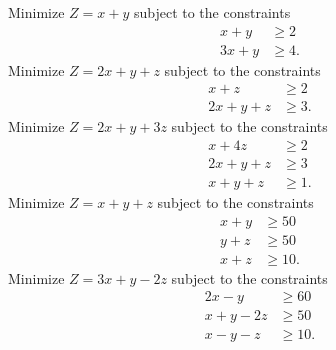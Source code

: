 
\begin{Exercise}[
name={},
title={}, 
difficulty=0,
origin={\cite{YL}}]

\Question Minimize $Z = x+y$ subject to the constraints
\begin{align*}
x+y  & \geq 2\\
3x+y & \geq 4.
\end{align*}
\Question Minimize $Z = 2x+y+z$ subject to the constraints
\begin{align*}
x+z & \geq 2\\
2x+y+z & \geq 3.
\end{align*}
\Question Minimize $Z = 2x+y+3z$ subject to the constraints
\begin{align*}
x+4z   & \geq 2\\
2x+y+z & \geq 3\\ 
x+y+z & \geq 1.
\end{align*}
\Question Minimize $Z = x+y+z$ subject to the constraints
\begin{align*}
x+y   & \geq 50\\
y+z & \geq 50\\ 
x+z & \geq 10.
\end{align*}
\Question Minimize $Z=3x+y-2z$ subject to the constraints
\begin{align*}
2x-y&\geq60\\
x+y-2z&\geq50\\
x-y-z&\geq10.
\end{align*}

\end{Exercise}

